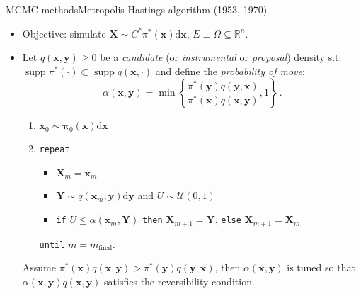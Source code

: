 \documentclass{beamer}
\newcommand{\Rset}{\mathbb{R}}
\newcommand{\id}{\mathrm{d}}
\newcommand{\xgj}{x}
\newcommand{\ygj}{y}
\newcommand{\ugj}{u}
\newcommand{\xg}{{\boldsymbol\xgj}}
\newcommand{\yg}{{\boldsymbol\ygj}}
\newcommand{\pdf}{\rho}
\newcommand{\tpdf}{\pdf_t}
\newcommand{\Ugj}{U}
\newcommand{\Xgj}{X}
\newcommand{\Ygj}{Y}
\newcommand{\Xg}{{\boldsymbol\Xgj}}
\newcommand{\Yg}{{\boldsymbol\Ygj}}
\newcommand{\PDFU}{{\mathcal U}}
\newcommand{\TKij}{\pi}
\newcommand{\TKi}{{\boldsymbol\pi}}
\newcommand{\SMi}{\TKij^*}
\begin{document}
\begin{frame}{MCMC methods}{Metropolis-Hastings algorithm (1953, 1970)}

\begin{itemize}
\item Objective: simulate $\Xg\sim C^*\SMi(\xg)\id\xg$, $E\equiv\Omega\subseteq\Rset^n$.
\item Let $q(\xg,\yg)\geq 0$ be a \emph{candidate} (or \emph{instrumental} or \emph{proposal}) density s.t. $\operatorname{supp}\SMi(\cdot)\subset\operatorname{supp}q(\xg,\cdot)$ and define the \emph{probability of move}: 
\begin{displaymath}
\alpha(\xg,\yg)=\operatorname{min}\left\{\frac{\SMi(\yg)q(\yg,\xg)}{\SMi(\xg)q(\xg,\yg)},1\right\}\,.
\end{displaymath}
\vspace{-0.3truecm}
\begin{enumerate}
\item $\xg_0\sim\TKi_0(\xg)\id\xg$
\item \texttt{repeat}
\begin{itemize}
\item $\Xg_m=\xg_m$
\item $\Yg\sim q(\xg_m,\yg)\id\yg$ and $\Ugj\sim\PDFU(0,1)$
\item \texttt{if} $\Ugj\leq\alpha(\xg_m,\Yg)$ \texttt{then} $\Xg_{m+1}=\Yg$, \texttt{else} $\Xg_{m+1}=\Xg_m$
\end{itemize}
\texttt{until} $m=m_\mathrm{final}$.
\end{enumerate}
\footnotesize{Assume $\SMi(\xg)q(\xg,\yg)>\SMi(\yg)q(\yg,\xg)$, then $\alpha(\xg,\yg)$ is tuned so that $\alpha(\xg,\yg)q(\xg,\yg)$ satisfies the reversibility condition.}
\end{itemize}

\end{frame}
\end{document}
